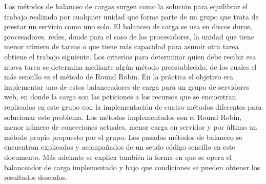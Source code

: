 Los métodos de balanceo de cargas surgen como la solución para equilibrar el trabajo realizado por cualquier unidad que forme parte de un grupo
que trata de prestar un servicio como uno solo. El balanceo de carga se usa en discos duros, procesadores, redes, donde para el caso de los
procesadores, la unidad que tiene menor número de tareas o que tiene más capacidad para asumir otra tarea obtiene el trabajo siguiente.
Los criterios para determinar quien debe recibir esa nueva tarea se determina mediante algún método preestablecido, de los cuales el más sencillo es
el método de Round Robin.
En la práctica el objetivo era implementar uno de estos balanceadores de carga para un grupo de servidores web, en donde la carga son las peticiones
a los recursos que se encuentran replicados en este grupo con la implementación de cuatro métodos diferentes para solucionar este problema. Los
métodos implementados son el Round Robin, menor número de conecciones actuales, menor carga en servidor y por último un método propio
propuesto por el grupo.
Los pasados métodos de balanceo se encuentran explicados y acompañados de un seudo código sencillo en este documento.
Más adelante se explica también la forma en que se opera el balanceador de carga implementado y bajo que condiciones se pueden obtener los
resultados deseados.\\


